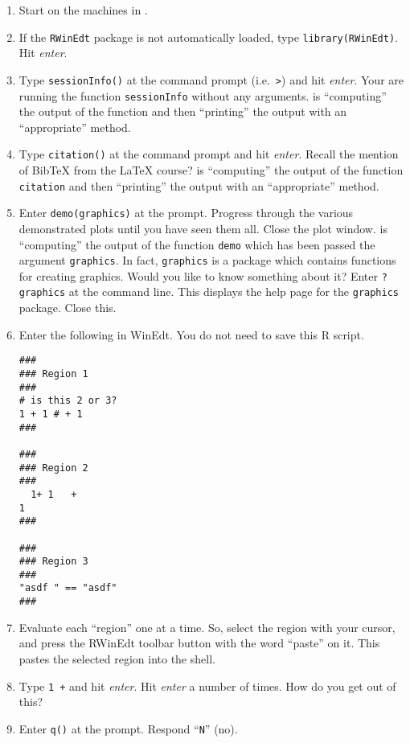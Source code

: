 \begin{enumerate}
\item Start \R{} on the machines in \tsl{}.

\item If the \texttt{RWinEdt} package is not automatically loaded,
  type \texttt{library(RWinEdt)}. Hit \textit{enter}.

\item Type \texttt{sessionInfo()} at the command prompt (i.e.\
  \texttt{>}) and hit \textit{enter}. Your are running the function
  \texttt{sessionInfo} without any arguments. \R{} is ``computing''
  the output of the function and then ``printing'' the output with an
  ``appropriate'' method.

\item Type \texttt{citation()} at the command prompt and hit
  \textit{enter}. Recall the mention of BibTeX from the \LaTeX{}
  course? \R{} is ``computing'' the output of the function
  \texttt{citation} and then ``printing'' the output with an
  ``appropriate'' method.

\item Enter \texttt{demo(graphics)} at the prompt. Progress through
  the various demonstrated plots until you have seen them all. Close
  the plot window. \R{} is ``computing'' the output of the function
  \texttt{demo} which has been passed the argument
  \texttt{graphics}. In fact, \texttt{graphics} is a package which
  contains functions for creating graphics. Would you like to know
  something about it? Enter \texttt{?graphics} at the command
  line. This displays the help page for the \texttt{graphics}
  package. Close this.

\item Enter the following in WinEdt. You do not need to save this R
  script.

\begin{verbatim}
###
### Region 1
###
# is this 2 or 3?
1 + 1 # + 1
###

###
### Region 2
###
  1+ 1   +
1
###

###
### Region 3
###
"asdf " == "asdf"
###
\end{verbatim}

\item Evaluate each ``region'' one at a time. So, select the region
  with your cursor, and press the RWinEdt toolbar button with the word
  ``paste'' on it. This pastes the selected region into the \R{}
  shell.

\item Type \texttt{1 +} and hit \textit{enter}. Hit \textit{enter} a
  number of times. How do you get out of this?

\item Enter \texttt{q()} at the prompt. Respond ``\texttt{N}'' (no).
\end{enumerate}

